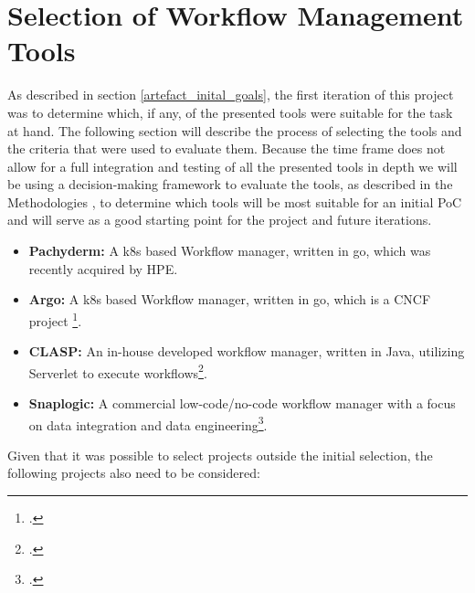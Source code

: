 \section{Selection of Workflow Management Tools}

As described in section \ref{artefact_inital_goals}, the first iteration of this project was to determine which, if any, of the presented tools were suitable for the task at hand.
The following section will describe the process of selecting the tools and the criteria that were used to evaluate them.
Because the time frame does not allow for a full integration and testing of all the presented tools in depth we will be using a decision-making framework to evaluate the tools,
as described in the Methodologies , to determine which tools will be most suitable for an initial \ac{PoC} and will serve as a good starting point for the project and future iterations.

\begin{itemize}
    \item \textbf{Pachyderm:} A \ac{k8s} based Workflow manager, written in go, which was recently acquired by \ac{HPE}.
    \item \textbf{Argo:} A \ac{k8s} based Workflow manager, written in go, which is a \ac{CNCF} project \footcite{ArgoprojArgoworkflows2023}.
    \item \textbf{\ac{CLASP}:}  An in-house developed workflow manager, written in Java, utilizing Serverlet to execute workflows\footcite{sayersCloudApplicationServices2015}.
    \item \textbf{Snaplogic:} A commercial low-code/no-code workflow manager with a focus on data integration and data engineering\footcite{IPaaSSolutionEnterprise}.
\end{itemize}

Given that it was possible to select projects outside the initial selection, the following projects also need to be considered:


